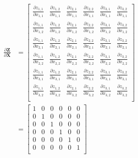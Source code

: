 \documentclass{article}
\newcommand{\matr}[1]{\mathbf{#1}} %
\begin{document}
\begin{align}
\frac{\partial \matr{Z}}{\partial \matr{X}} &=
\begin{bmatrix}
\frac{\partial z_{1,1}}{\partial x_{1,1}} & \frac{\partial z_{1,2}}{\partial x_{1,1}} & \frac{\partial z_{2,1}}{\partial x_{1,1}} & \frac{\partial z_{2,2}}{\partial x_{1,1}} & \frac{\partial z_{3,1}}{\partial x_{1,1}} & \frac{\partial z_{3,2}}{\partial x_{1,1}}\\[0.7em]
\frac{\partial z_{1,1}}{\partial x_{1,2}} & \frac{\partial z_{1,2}}{\partial x_{1,2}} & \frac{\partial z_{2,1}}{\partial x_{1,2}} & \frac{\partial z_{2,2}}{\partial x_{1,2}} & \frac{\partial z_{3,1}}{\partial x_{1,2}} & \frac{\partial z_{3,2}}{\partial x_{1,2}}\\[0.7em]
\frac{\partial z_{1,1}}{\partial x_{2,1}} & \frac{\partial z_{1,2}}{\partial x_{2,1}} & \frac{\partial z_{2,1}}{\partial x_{2,1}} & \frac{\partial z_{2,2}}{\partial x_{2,1}} & \frac{\partial z_{3,1}}{\partial x_{2,1}} & \frac{\partial z_{3,2}}{\partial x_{2,1}}\\[0.7em]
\frac{\partial z_{1,1}}{\partial x_{2,2}} & \frac{\partial z_{1,2}}{\partial x_{2,2}} & \frac{\partial z_{2,1}}{\partial x_{2,2}} & \frac{\partial z_{2,2}}{\partial x_{2,2}} & \frac{\partial z_{3,1}}{\partial x_{2,2}} & \frac{\partial z_{3,2}}{\partial x_{2,2}}\\[0.7em]
\frac{\partial z_{1,1}}{\partial x_{3,1}} & \frac{\partial z_{1,2}}{\partial x_{3,1}} & \frac{\partial z_{2,1}}{\partial x_{3,1}} & \frac{\partial z_{2,2}}{\partial x_{3,1}} & \frac{\partial z_{3,1}}{\partial x_{3,1}} & \frac{\partial z_{3,2}}{\partial x_{3,1}}\\[0.7em]
\frac{\partial z_{1,1}}{\partial x_{3,2}} & \frac{\partial z_{1,2}}{\partial x_{3,2}} & \frac{\partial z_{2,1}}{\partial x_{3,2}} & \frac{\partial z_{2,2}}{\partial x_{3,2}} & \frac{\partial z_{3,1}}{\partial x_{3,2}} & \frac{\partial z_{3,2}}{\partial x_{3,2}}\\[0.7em]
\end{bmatrix} \nonumber
\\ \label{dZbydX_matrix_addition}
&=
\begin{bmatrix}
1 & 0 & 0 & 0 & 0 & 0 \\%
0 & 1 & 0 & 0 & 0 & 0 \\%
0 & 0 & 1 & 0 & 0 & 0 \\%
0 & 0 & 0 & 1 & 0 & 0 \\%
0 & 0 & 0 & 0 & 1 & 0 \\%
0 & 0 & 0 & 0 & 0 & 1 \\%
\end{bmatrix}
\end{align}
\end{document}
